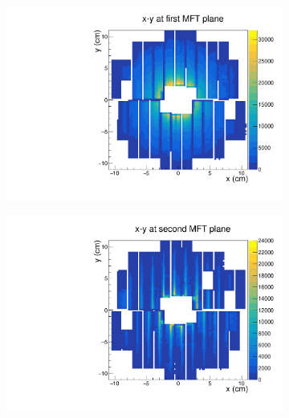 \begin{figure}[h]%
    \centering
    \begin{subfigure}[t]{.49\linewidth}
        \centering
        \includegraphics[width=\linewidth]{Plots/pass4_MFT/x_y_1_pass4.pdf}
        \caption{}
        \label{}
    \end{subfigure}
    \hfill
    \begin{subfigure}[t]{.49\linewidth}
        \centering
        \includegraphics[width=\linewidth]{Plots/pass4_MFT/x_y_2_pass4.pdf}
        \caption{}
        \label{}
    \end{subfigure}
    \begin{subfigure}[t]{.49\linewidth}
        \centering

\end{subfigure}
\end{figure}
